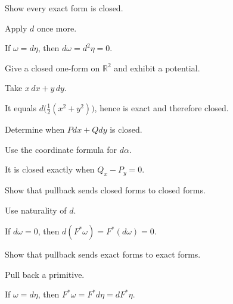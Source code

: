 \begin{exercise}\label{exr:vii09-16}
Show every exact form is closed.
\end{exercise}
\begin{hint}
Apply \(d\) once more.
\end{hint}
\begin{solution}
If \(\omega=d\eta\), then \(d\omega=d^2\eta=0\).
\end{solution}

\begin{exercise}\label{exr:vii09-17}
Give a closed one-form on \(\mathbb R^2\) and exhibit a potential.
\end{exercise}
\begin{hint}
Take \(x\,dx+y\,dy\).
\end{hint}
\begin{solution}
It equals \(d\bigl(\tfrac12(x^2+y^2)\bigr)\), hence is exact and therefore closed.
\end{solution}

\begin{exercise}\label{exr:vii09-18}
Determine when \(Pdx+Qdy\) is closed.
\end{exercise}
\begin{hint}
Use the coordinate formula for \(d\alpha\).
\end{hint}
\begin{solution}
It is closed exactly when \(Q_x-P_y=0\).
\end{solution}

\begin{exercise}\label{exr:vii09-19}
Show that pullback sends closed forms to closed forms.
\end{exercise}
\begin{hint}
Use naturality of \(d\).
\end{hint}
\begin{solution}
If \(d\omega=0\), then \(d(F^*\omega)=F^*(d\omega)=0\).
\end{solution}

\begin{exercise}\label{exr:vii09-20}
Show that pullback sends exact forms to exact forms.
\end{exercise}
\begin{hint}
Pull back a primitive.
\end{hint}
\begin{solution}
If \(\omega=d\eta\), then \(F^*\omega=F^*d\eta=dF^*\eta\).
\end{solution}

